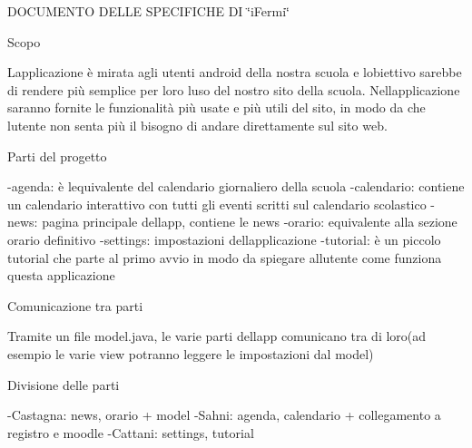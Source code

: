 D\+O\+C\+U\+M\+E\+N\+TO D\+E\+L\+LE S\+P\+E\+C\+I\+F\+I\+C\+HE DI \char`\"{}i\+Fermi\char`\"{}

Scopo

L\textquotesingle{}applicazione è mirata agli utenti android della nostra scuola e l\textquotesingle{}obiettivo sarebbe di rendere più semplice per loro l\textquotesingle{}uso del nostro sito della scuola. Nell\textquotesingle{}applicazione saranno fornite le funzionalità più usate e più utili del sito, in modo da che l\textquotesingle{}utente non senta più il bisogno di andare direttamente sul sito web.

Parti del progetto

-\/agenda\+: è l\textquotesingle{}equivalente del calendario giornaliero della scuola -\/calendario\+: contiene un calendario interattivo con tutti gli eventi scritti sul calendario scolastico -\/news\+: pagina principale dell\textquotesingle{}app, contiene le news -\/orario\+: equivalente alla sezione orario definitivo -\/settings\+: impostazioni dell\textquotesingle{}applicazione -\/tutorial\+: è un piccolo tutorial che parte al primo avvio in modo da spiegare all\textquotesingle{}utente come funziona questa applicazione

Comunicazione tra parti

Tramite un file model.\+java, le varie parti dell\textquotesingle{}app comunicano tra di loro(ad esempio le varie view potranno leggere le impostazioni dal model)

Divisione delle parti

-\/Castagna\+: news, orario + model -\/Sahni\+: agenda, calendario + collegamento a registro e moodle -\/Cattani\+: settings, tutorial 